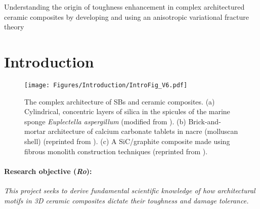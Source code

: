 \documentclass[10pt,letterpaper]{article}
\begin{document}
\setcounter{page}{1}

\begin{center}
  \fontsize{12}{2em}
  \selectfont
  Understanding the origin of toughness enhancement in complex architectured ceramic composites by developing and using an anisotropic variational fracture theory
\end{center}

\section{Introduction}
  \label{s:Intro}

    \begin{figure}[b!]
      \centering
        \texttt{[image: Figures/Introduction/IntroFig\_V6.pdf]}
        \caption{ \footnotesize The complex architecture of SBs and ceramic composites. (a) Cylindrical, concentric layers of silica in the spicules of the marine sponge \textit{Euplectella aspergillum} (modified from \cite{monn2015new}). (b) Brick-and-mortar architecture of calcium carbonate tablets in nacre (molluscan shell) (reprinted from \cite{ritchie2011conflicts}). (c) A SiC/graphite composite made using fibrous monolith construction techniques (reprinted from \cite{baskaran1993fibrous}).
          }
        \label{f:intro}
    \end{figure}


  \paragraph{Research objective (\emph{Ro}):} \emph{This project seeks to derive fundamental scientific  knowledge of  how architectural motifs in 3D ceramic composites dictate their toughness and damage tolerance.}
\end{document}
